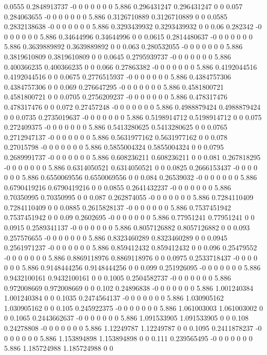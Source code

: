 {0.0555 0.2848913737 -0 0 0 0 0 0 0 5.886 0.296431247 0.296431247 0 0
0.057 0.284063655 -0 0 0 0 0 0 0 5.886 0.3126710889 0.3126710889 0 0
0.0585 0.2832138638 -0 0 0 0 0 0 0 5.886 0.3293439932 0.3293439932 0 0
0.06 0.282342 -0 0 0 0 0 0 0 5.886 0.34644996 0.34644996 0 0
0.0615 0.2814480637 -0 0 0 0 0 0 0 5.886 0.3639889892 0.3639889892 0 0
0.063 0.280532055 -0 0 0 0 0 0 0 5.886 0.3819610809 0.3819610809 0 0
0.0645 0.2795939737 -0 0 0 0 0 0 0 5.886 0.400366235 0.400366235 0 0
0.066 0.27863382 -0 0 0 0 0 0 0 5.886 0.4192044516 0.4192044516 0 0
0.0675 0.2776515937 -0 0 0 0 0 0 0 5.886 0.4384757306 0.4384757306 0 0
0.069 0.276647295 -0 0 0 0 0 0 0 5.886 0.4581800721 0.4581800721 0 0
0.0705 0.2756209237 -0 0 0 0 0 0 0 5.886 0.478317476 0.478317476 0 0
0.072 0.27457248 -0 0 0 0 0 0 0 5.886 0.4988879424 0.4988879424 0 0
0.0735 0.2735019637 -0 0 0 0 0 0 0 5.886 0.5198914712 0.5198914712 0 0
0.075 0.272409375 -0 0 0 0 0 0 0 5.886 0.5413280625 0.5413280625 0 0
0.0765 0.2712947137 -0 0 0 0 0 0 0 5.886 0.5631977162 0.5631977162 0 0
0.078 0.27015798 -0 0 0 0 0 0 0 5.886 0.5855004324 0.5855004324 0 0
0.0795 0.2689991737 -0 0 0 0 0 0 0 5.886 0.608236211 0.608236211 0 0
0.081 0.267818295 -0 0 0 0 0 0 0 5.886 0.6314050521 0.6314050521 0 0
0.0825 0.2666153437 -0 0 0 0 0 0 0 5.886 0.6550069556 0.6550069556 0 0
0.084 0.26539032 -0 0 0 0 0 0 0 5.886 0.6790419216 0.6790419216 0 0
0.0855 0.2641432237 -0 0 0 0 0 0 0 5.886 0.70350995 0.70350995 0 0
0.087 0.262874055 -0 0 0 0 0 0 0 5.886 0.7284110409 0.7284110409 0 0
0.0885 0.2615828137 -0 0 0 0 0 0 0 5.886 0.7537451942 0.7537451942 0 0
0.09 0.2602695 -0 0 0 0 0 0 0 5.886 0.77951241 0.77951241 0 0
0.0915 0.2589341137 -0 0 0 0 0 0 0 5.886 0.8057126882 0.8057126882 0 0
0.093 0.257576655 -0 0 0 0 0 0 0 5.886 0.8323460289 0.8323460289 0 0
0.0945 0.2561971237 -0 0 0 0 0 0 0 5.886 0.859412432 0.859412432 0 0
0.096 0.25479552 -0 0 0 0 0 0 0 5.886 0.8869118976 0.8869118976 0 0
0.0975 0.2533718437 -0 0 0 0 0 0 0 5.886 0.9148444256 0.9148444256 0 0
0.099 0.251926095 -0 0 0 0 0 0 0 5.886 0.9432100161 0.9432100161 0 0
0.1005 0.2504582737 -0 0 0 0 0 0 0 5.886 0.972008669 0.972008669 0 0
0.102 0.24896838 -0 0 0 0 0 0 0 5.886 1.001240384 1.001240384 0 0
0.1035 0.2474564137 -0 0 0 0 0 0 0 5.886 1.030905162 1.030905162 0 0
0.105 0.245922375 -0 0 0 0 0 0 0 5.886 1.061003003 1.061003002 0 0
0.1065 0.2443662637 -0 0 0 0 0 0 0 5.886 1.091533905 1.091533905 0 0
0.108 0.24278808 -0 0 0 0 0 0 0 5.886 1.12249787 1.12249787 0 0
0.1095 0.2411878237 -0 0 0 0 0 0 0 5.886 1.153894898 1.153894898 0 0
0.111 0.239565495 -0 0 0 0 0 0 0 5.886 1.185724988 1.185724988 0 0
}
